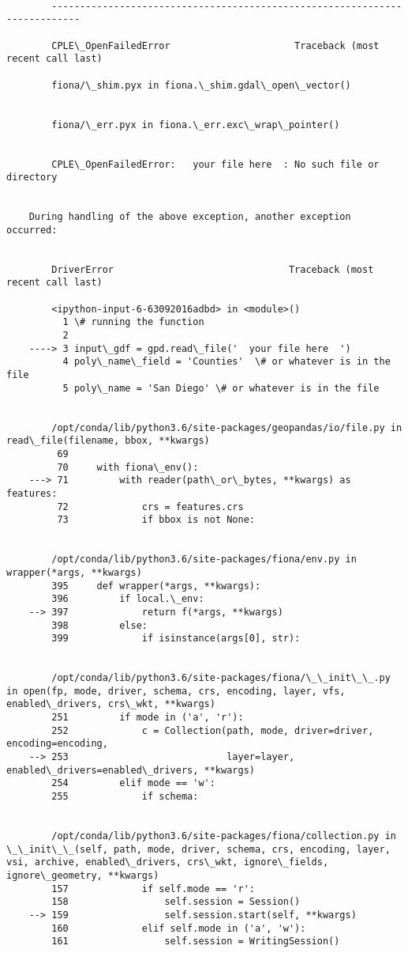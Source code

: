 \documentclass[11pt]{article}
\begin{document}
    \begin{Verbatim}[commandchars=\\\{\}]

        ---------------------------------------------------------------------------

        CPLE\_OpenFailedError                      Traceback (most recent call last)

        fiona/\_shim.pyx in fiona.\_shim.gdal\_open\_vector()


        fiona/\_err.pyx in fiona.\_err.exc\_wrap\_pointer()


        CPLE\_OpenFailedError:   your file here  : No such file or directory

        
    During handling of the above exception, another exception occurred:


        DriverError                               Traceback (most recent call last)

        <ipython-input-6-63092016adbd> in <module>()
          1 \# running the function
          2 
    ----> 3 input\_gdf = gpd.read\_file('  your file here  ')
          4 poly\_name\_field = 'Counties'  \# or whatever is in the file
          5 poly\_name = 'San Diego' \# or whatever is in the file


        /opt/conda/lib/python3.6/site-packages/geopandas/io/file.py in read\_file(filename, bbox, **kwargs)
         69 
         70     with fiona\_env():
    ---> 71         with reader(path\_or\_bytes, **kwargs) as features:
         72             crs = features.crs
         73             if bbox is not None:


        /opt/conda/lib/python3.6/site-packages/fiona/env.py in wrapper(*args, **kwargs)
        395     def wrapper(*args, **kwargs):
        396         if local.\_env:
    --> 397             return f(*args, **kwargs)
        398         else:
        399             if isinstance(args[0], str):


        /opt/conda/lib/python3.6/site-packages/fiona/\_\_init\_\_.py in open(fp, mode, driver, schema, crs, encoding, layer, vfs, enabled\_drivers, crs\_wkt, **kwargs)
        251         if mode in ('a', 'r'):
        252             c = Collection(path, mode, driver=driver, encoding=encoding,
    --> 253                            layer=layer, enabled\_drivers=enabled\_drivers, **kwargs)
        254         elif mode == 'w':
        255             if schema:


        /opt/conda/lib/python3.6/site-packages/fiona/collection.py in \_\_init\_\_(self, path, mode, driver, schema, crs, encoding, layer, vsi, archive, enabled\_drivers, crs\_wkt, ignore\_fields, ignore\_geometry, **kwargs)
        157             if self.mode == 'r':
        158                 self.session = Session()
    --> 159                 self.session.start(self, **kwargs)
        160             elif self.mode in ('a', 'w'):
        161                 self.session = WritingSession()



\end{Verbatim}
\end{document}
